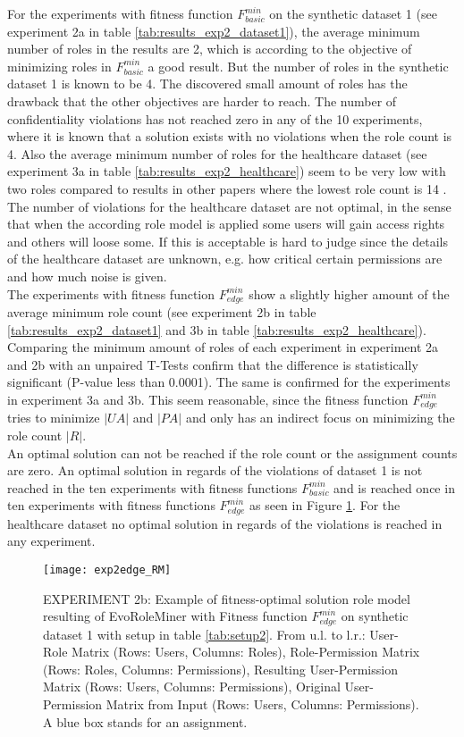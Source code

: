 For the experiments with fitness function $F_{basic}^{min}$ on the synthetic dataset 1 (see experiment 2a in table \ref{tab:results_exp2_dataset1}), the average minimum number of roles in the results are 2, which is according to the objective of minimizing roles in $F_{basic}^{min}$ a good result. But the number of roles in the synthetic dataset 1 is known to be 4. The discovered small amount of roles has the drawback that the other objectives are harder to reach. The number of confidentiality violations has not reached zero in any of the 10 experiments, where it is known that a solution exists with no violations when the role count is 4. Also the average minimum number of roles for the healthcare dataset (see experiment 3a in table \ref{tab:results_exp2_healthcare}) seem to be very low with two roles compared to results in other papers where the lowest role count is 14 \cite{Ene}\cite{Molloy:2009:ERM:1542207.1542224}. The number of violations for the healthcare dataset are not optimal, in the sense that when the according role model is applied some users will gain access rights and others will loose some. If this is acceptable is hard to judge since the details of the healthcare dataset are unknown, e.g. how critical certain permissions are and how much noise is given.\\
The experiments with fitness function $F_{edge}^{min}$ show a slightly higher amount of the average minimum role count (see experiment 2b in table \ref{tab:results_exp2_dataset1} and 3b in table \ref{tab:results_exp2_healthcare}). Comparing the minimum amount of roles of each experiment in experiment 2a and 2b with an unpaired T-Tests confirm that the difference is statistically significant (P-value less than 0.0001). The same is confirmed for the experiments in experiment 3a and 3b. This seem reasonable, since the fitness function $F_{edge}^{min}$ tries to minimize $|UA|$ and $|PA|$ and only has an indirect focus on minimizing the role count $|R|$.\\
An optimal solution can not be reached if the role count or the assignment counts are zero. An optimal solution in regards of the violations of dataset 1 is not reached in the ten experiments with fitness functions $F_{basic}^{min}$ and is reached once in ten experiments with fitness functions $F_{edge}^{min}$ as seen in Figure \ref{fig:exp2edge_RM}. For the healthcare dataset no optimal solution in regards of the violations is reached in any experiment.\\

\begin{figure}[H]
	\centering
	\texttt{[image: exp2edge\_RM]}
	\caption{EXPERIMENT 2b: Example of fitness-optimal solution role model resulting of EvoRoleMiner with Fitness function $F_{edge}^{min}$ on synthetic dataset 1 with setup in table \ref{tab:setup2}. From u.l. to l.r.: User-Role Matrix (Rows: Users, Columns: Roles), Role-Permission Matrix (Rows: Roles, Columns: Permissions), Resulting User-Permission Matrix (Rows: Users, Columns: Permissions), Original User-Permission Matrix from Input (Rows: Users, Columns: Permissions). A blue box stands for an assignment.}
	\label{fig:exp2edge_RM}
\end{figure}

